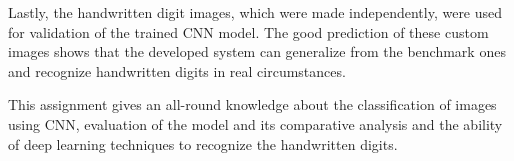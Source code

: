 Lastly, the handwritten digit images, which were made independently, were used for validation of the trained CNN model. The good prediction of these custom images shows that the developed system can generalize from the benchmark ones and recognize handwritten digits in real circumstances.

This assignment gives an all-round knowledge about the classification of images using CNN, evaluation of the model and its comparative analysis and the ability of deep learning techniques to recognize the handwritten digits.